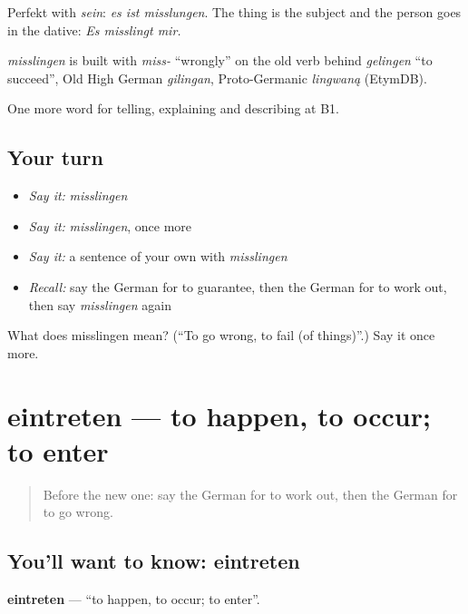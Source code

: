 Perfekt with \emph{sein}: \emph{es ist misslungen}. The thing is the subject and the person goes in the dative: \emph{Es misslingt mir.}

\begin{cousinweb}
\emph{misslingen} is built with \emph{miss-} \textquotedblleft{}wrongly\textquotedblright{} on the old verb behind \emph{gelingen} \textquotedblleft{}to succeed\textquotedblright{}, Old High German \emph{gilingan}, Proto-Germanic \emph{lingwaną} (EtymDB).
\end{cousinweb}

\begin{grammarlens}[title={What you've built}]
One more word for telling, explaining and describing at B1.
\end{grammarlens}

\subsection*{Your turn}
\begin{itemize}
\raggedright
  \item \emph{Say it:} \emph{misslingen}
  \item \emph{Say it:} \emph{misslingen}, once more
  \item \emph{Say it:} a sentence of your own with \emph{misslingen}
  \item \emph{Recall:} say the German for to guarantee, then the German for to work out, then say \emph{misslingen} again
\end{itemize}

\begin{tcolorbox}[breakable,colback=teal!4,colframe=teal!35!black,title={Before you move on}]
What does misslingen mean? (\textquotedblleft{}To go wrong, to fail (of things)\textquotedblright{}.) Say it once more.
\end{tcolorbox}
\section[eintreten]{eintreten — to happen, to occur; to enter}

\label{lesson:GE-C370-eintreten}



\begin{quote}
Before the new one: say the German for to work out, then the German for to go wrong.
\end{quote}

\subsection*{You'll want to know: eintreten}
\textbf{eintreten} — \textquotedblleft{}to happen, to occur; to enter\textquotedblright{}.

